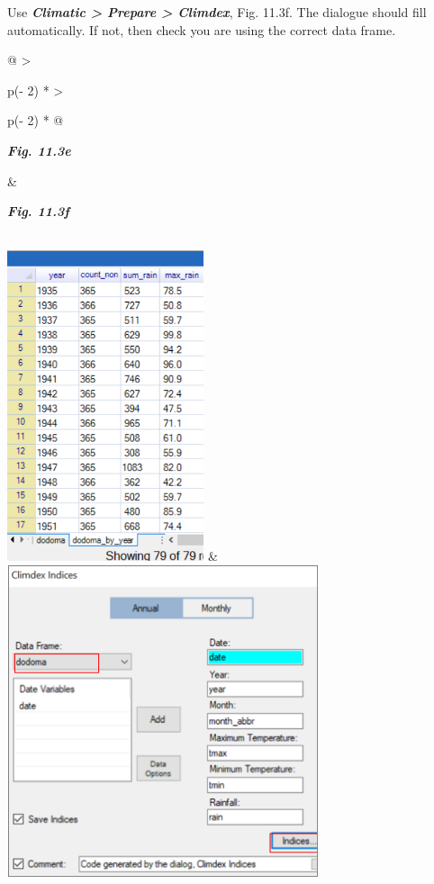 \documentclass[
  letterpaper,
  DIV=11,
  numbers=noendperiod]{scrreprt}
\begin{document}
Use \textbf{\emph{Climatic \textgreater{} Prepare \textgreater{}
Climdex}}, Fig. 11.3f. The dialogue should fill automatically. If not,
then check you are using the correct data frame.

\begin{longtable}[]{@{}
  >{\raggedright\arraybackslash}p{(\columnwidth - 2\tabcolsep) * }
  >{\raggedright\arraybackslash}p{(\columnwidth - 2\tabcolsep) * }@{}}
\toprule\noalign{}
\begin{minipage}[b]{\linewidth}\raggedright
\textbf{\emph{Fig. 11.3e}}
\end{minipage} & \begin{minipage}[b]{\linewidth}\raggedright
\textbf{\emph{Fig. 11.3f}}
\end{minipage} \\
\midrule\noalign{}
\endhead
\bottomrule\noalign{}
\endlastfoot
\includegraphics[width=2.27533in,height=3.59173in]{figures/Fig11.3e.png}
&
\includegraphics[width=3.6113in,height=3.6113in]{figures/Fig11.3f.png} \\
\end{longtable}
\end{document}
